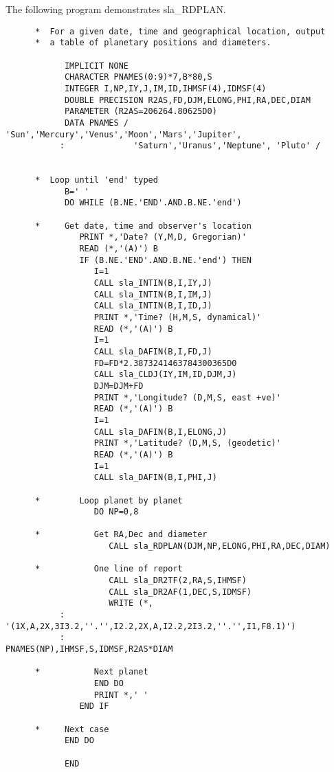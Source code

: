 \documentclass[11pt,twoside]{article}
\begin{document}
The following program demonstrates
sla\_RDPLAN.
\begin{verbatim}
      *  For a given date, time and geographical location, output
      *  a table of planetary positions and diameters.

            IMPLICIT NONE
            CHARACTER PNAMES(0:9)*7,B*80,S
            INTEGER I,NP,IY,J,IM,ID,IHMSF(4),IDMSF(4)
            DOUBLE PRECISION R2AS,FD,DJM,ELONG,PHI,RA,DEC,DIAM
            PARAMETER (R2AS=206264.80625D0)
            DATA PNAMES / 'Sun','Mercury','Venus','Moon','Mars','Jupiter',
           :              'Saturn','Uranus','Neptune', 'Pluto' /


      *  Loop until 'end' typed
            B=' '
            DO WHILE (B.NE.'END'.AND.B.NE.'end')

      *     Get date, time and observer's location
               PRINT *,'Date? (Y,M,D, Gregorian)'
               READ (*,'(A)') B
               IF (B.NE.'END'.AND.B.NE.'end') THEN
                  I=1
                  CALL sla_INTIN(B,I,IY,J)
                  CALL sla_INTIN(B,I,IM,J)
                  CALL sla_INTIN(B,I,ID,J)
                  PRINT *,'Time? (H,M,S, dynamical)'
                  READ (*,'(A)') B
                  I=1
                  CALL sla_DAFIN(B,I,FD,J)
                  FD=FD*2.3873241463784300365D0
                  CALL sla_CLDJ(IY,IM,ID,DJM,J)
                  DJM=DJM+FD
                  PRINT *,'Longitude? (D,M,S, east +ve)'
                  READ (*,'(A)') B
                  I=1
                  CALL sla_DAFIN(B,I,ELONG,J)
                  PRINT *,'Latitude? (D,M,S, (geodetic)'
                  READ (*,'(A)') B
                  I=1
                  CALL sla_DAFIN(B,I,PHI,J)

      *        Loop planet by planet
                  DO NP=0,8

      *           Get RA,Dec and diameter
                     CALL sla_RDPLAN(DJM,NP,ELONG,PHI,RA,DEC,DIAM)

      *           One line of report
                     CALL sla_DR2TF(2,RA,S,IHMSF)
                     CALL sla_DR2AF(1,DEC,S,IDMSF)
                     WRITE (*,
           : '(1X,A,2X,3I3.2,''.'',I2.2,2X,A,I2.2,2I3.2,''.'',I1,F8.1)')
           :                          PNAMES(NP),IHMSF,S,IDMSF,R2AS*DIAM

      *           Next planet
                  END DO
                  PRINT *,' '
               END IF

      *     Next case
            END DO

            END
\end{verbatim}
\end{document}
